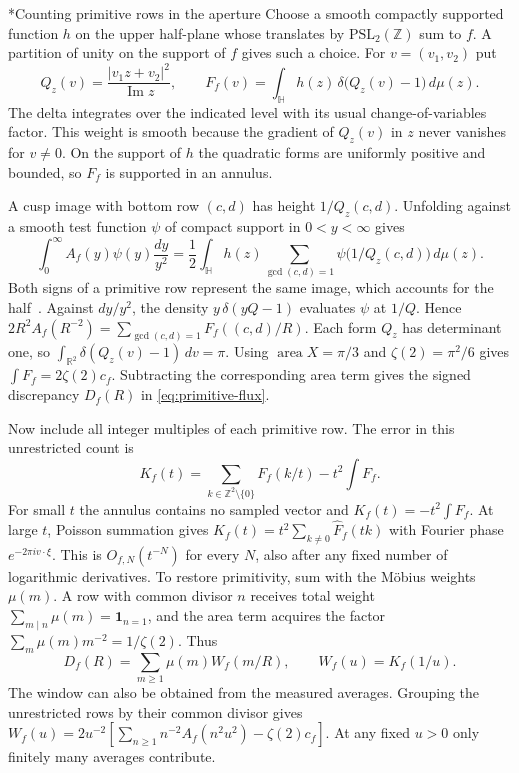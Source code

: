 \documentclass[11pt,letterpaper]{article}
\makeatletter
\renewcommand\subsection{\@startsection{subsection}{2}{\z@}{-2.0ex plus -.3ex}{.75ex}{\normalfont\normalsize\itshape}}
\numberwithin{equation}{section}
\makeatother
\begin{document}
\subsection*{Counting primitive rows in the aperture}\label{app:primitive-rows}
Choose a smooth compactly supported function $h$ on the upper half-plane whose translates by $\mathrm{PSL}_2(\mathbb Z)$ sum to $f$. A partition of unity on the support of $f$ gives such a choice. For $v=(v_1,v_2)$ put
\[
 Q_z(v)=\frac{|v_1z+v_2|^2}{\operatorname{Im}z},\qquad
 F_f(v)=\int_{\mathbb H}h(z)\,\delta\bigl(Q_z(v)-1\bigr)\,d\mu(z).
\]
The delta integrates over the indicated level with its usual change-of-variables factor. This weight is smooth because the gradient of $Q_z(v)$ in $z$ never vanishes for $v\ne0$. On the support of $h$ the quadratic forms are uniformly positive and bounded, so $F_f$ is supported in an annulus.

A cusp image with bottom row $(c,d)$ has height $1/Q_z(c,d)$. Unfolding against a smooth test function $\psi$ of compact support in $0<y<\infty$ gives
\[
 \int_0^\infty A_f(y)\psi(y)\frac{dy}{y^2}
 =\frac12\int_{\mathbb H}h(z)
          \sum_{\gcd(c,d)=1}\psi\bigl(1/Q_z(c,d)\bigr)\,d\mu(z).
\]
Both signs of a primitive row represent the same image, which accounts for the half~\cite[pp.~275--280]{zagier}. Against $dy/y^2$, the density $y\,\delta(yQ-1)$ evaluates $\psi$ at $1/Q$. Hence $2R^2 A_f(R^{-2})=\sum_{\gcd(c,d)=1}F_f((c,d)/R)$. Each form $Q_z$ has determinant one, so $\int_{\mathbb R^2}\delta(Q_z(v)-1)\,dv=\pi$. Using $\operatorname{area}X=\pi/3$ and $\zeta(2)=\pi^2/6$ gives $\int F_f=2\zeta(2)c_f$. Subtracting the corresponding area term gives the signed discrepancy $D_f(R)$ in \eqref{eq:primitive-flux}.

Now include all integer multiples of each primitive row. The error in this unrestricted count is
\[
 K_f(t)=\sum_{k\in\mathbb Z^2\setminus\{0\}}F_f(k/t)-t^2\int F_f .
\]
For small $t$ the annulus contains no sampled vector and $K_f(t)=-t^2\int F_f$. At large $t$, Poisson summation gives $K_f(t)=t^2\sum_{k\ne0}\widehat F_f(tk)$ with Fourier phase $e^{-2\pi i v\cdot\xi}$. This is $O_{f,N}(t^{-N})$ for every $N$, also after any fixed number of logarithmic derivatives. To restore primitivity, sum with the M\"obius weights $\mu(m)$. A row with common divisor $n$ receives total weight $\sum_{m\mid n}\mu(m)=\mathbf1_{n=1}$, and the area term acquires the factor $\sum_m\mu(m)m^{-2}=1/\zeta(2)$. Thus
\[
 D_f(R)=\sum_{m\ge1}\mu(m)W_f(m/R),\qquad W_f(u)=K_f(1/u).
\]
The window can also be obtained from the measured averages. Grouping the unrestricted rows by their common divisor gives $W_f(u)=2u^{-2}[\sum_{n\ge1}n^{-2}A_f(n^2u^2)-\zeta(2)c_f]$. At any fixed $u>0$ only finitely many averages contribute.
\end{document}
